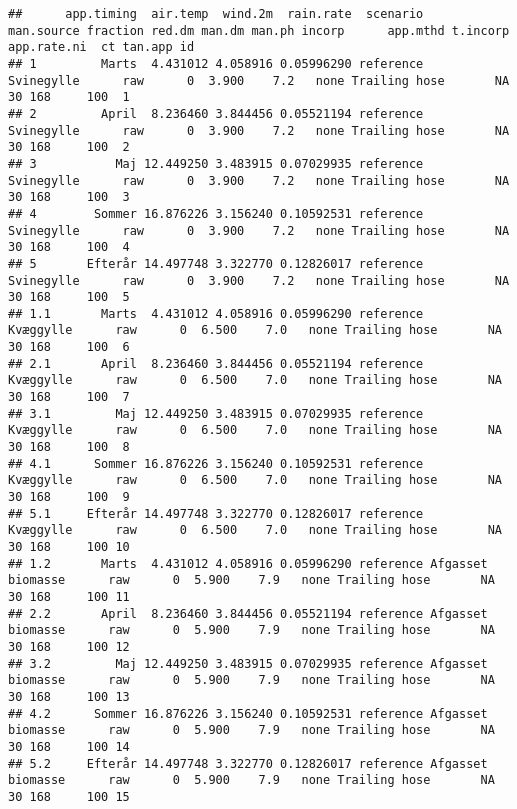 \documentclass[
  landscape]{article}
\begin{document}
\begin{verbatim}
##      app.timing  air.temp  wind.2m  rain.rate  scenario        man.source fraction red.dm man.dm man.ph incorp      app.mthd t.incorp app.rate.ni  ct tan.app id
## 1         Marts  4.431012 4.058916 0.05996290 reference        Svinegylle      raw      0  3.900    7.2   none Trailing hose       NA          30 168     100  1
## 2         April  8.236460 3.844456 0.05521194 reference        Svinegylle      raw      0  3.900    7.2   none Trailing hose       NA          30 168     100  2
## 3           Maj 12.449250 3.483915 0.07029935 reference        Svinegylle      raw      0  3.900    7.2   none Trailing hose       NA          30 168     100  3
## 4        Sommer 16.876226 3.156240 0.10592531 reference        Svinegylle      raw      0  3.900    7.2   none Trailing hose       NA          30 168     100  4
## 5       Efterår 14.497748 3.322770 0.12826017 reference        Svinegylle      raw      0  3.900    7.2   none Trailing hose       NA          30 168     100  5
## 1.1       Marts  4.431012 4.058916 0.05996290 reference         Kvæggylle      raw      0  6.500    7.0   none Trailing hose       NA          30 168     100  6
## 2.1       April  8.236460 3.844456 0.05521194 reference         Kvæggylle      raw      0  6.500    7.0   none Trailing hose       NA          30 168     100  7
## 3.1         Maj 12.449250 3.483915 0.07029935 reference         Kvæggylle      raw      0  6.500    7.0   none Trailing hose       NA          30 168     100  8
## 4.1      Sommer 16.876226 3.156240 0.10592531 reference         Kvæggylle      raw      0  6.500    7.0   none Trailing hose       NA          30 168     100  9
## 5.1     Efterår 14.497748 3.322770 0.12826017 reference         Kvæggylle      raw      0  6.500    7.0   none Trailing hose       NA          30 168     100 10
## 1.2       Marts  4.431012 4.058916 0.05996290 reference Afgasset biomasse      raw      0  5.900    7.9   none Trailing hose       NA          30 168     100 11
## 2.2       April  8.236460 3.844456 0.05521194 reference Afgasset biomasse      raw      0  5.900    7.9   none Trailing hose       NA          30 168     100 12
## 3.2         Maj 12.449250 3.483915 0.07029935 reference Afgasset biomasse      raw      0  5.900    7.9   none Trailing hose       NA          30 168     100 13
## 4.2      Sommer 16.876226 3.156240 0.10592531 reference Afgasset biomasse      raw      0  5.900    7.9   none Trailing hose       NA          30 168     100 14
## 5.2     Efterår 14.497748 3.322770 0.12826017 reference Afgasset biomasse      raw      0  5.900    7.9   none Trailing hose       NA          30 168     100 15

\end{verbatim}
\end{document}
